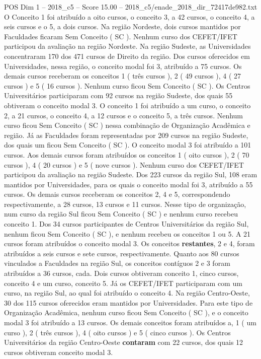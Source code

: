 \begin{textsample}{POS Dim 1 – 2018\_c5 – Score 15.00 – 2018\_c5/enade\_2018\_dir\_72417de982.txt}
O Conceito 1 foi atribuído a oito cursos, o conceito 3, a 42 cursos, o conceito 4, a seis cursos e o 5, a dois cursos.
Na região Nordeste, dois cursos mantidos por Faculdades ficaram Sem Conceito ( SC ).
Nenhum curso dos CEFET/IFET participou da avaliação na região Nordeste.
Na região Sudeste, as Universidades concentraram 170 dos 471 cursos de Direito da região.
Dos cursos oferecidos em Universidades, nessa região, o conceito modal foi 3, atribuído a 75 cursos.
Os demais cursos receberam os conceitos 1 ( três cursos ), 2 ( 49 cursos ), 4 ( 27 cursos ) e 5 ( 16 cursos ).
Nenhum curso ficou Sem Conceito ( SC ).
Os Centros Universitários participaram com 92 cursos na região Sudeste, dos quais 55 obtiveram o conceito modal 3.
O conceito 1 foi atribuído a um curso, o conceito 2, a 21 cursos, o conceito 4, a 12 cursos e o conceito 5, a três cursos.
Nenhum curso ficou Sem Conceito ( SC ) nessa combinação de Organização Acadêmica e região.
Já as Faculdades foram representadas por 209 cursos na região Sudeste, dos quais um ficou Sem Conceito ( SC ).
O conceito modal 3 foi atribuído a 101 cursos.
Aos demais cursos foram atribuídos os conceitos 1 ( oito cursos ), 2 ( 70 cursos ), 4 ( 20 cursos ) e 5 ( nove cursos ).
Nenhum curso dos CEFET/IFET participou da avaliação na região Sudeste.
Dos 223 cursos da região Sul, 108 eram mantidos por Universidades, para os quais o conceito modal foi 3, atribuído a 55 cursos.
Os demais cursos receberam os conceitos 2, 4 e 5, correspondendo respectivamente, a 28 cursos, 13 cursos e 11 cursos.
Nesse tipo de organização, num curso da região Sul ficou Sem Conceito ( SC ) e nenhum curso recebeu conceito 1.
Dos 34 cursos participantes de Centros Universitários da região Sul, nenhum ficou Sem Conceito ( SC ), e nenhum recebeu os conceitos 1 ou 5.
A 21 cursos foram atribuídos o conceito modal 3.
Os conceitos \textbf{restantes}, 2 e 4, foram atribuídos a seis cursos e sete cursos, respectivamente.
Quanto aos 80 cursos vinculados a Faculdades na região Sul, os conceitos contíguos 2 e 3 foram atribuídos a 36 cursos, cada.
Dois cursos obtiveram conceito 1, cinco cursos, conceito 4 e um curso, conceito 5.
Já os CEFET/IFET participaram com um curso, na região Sul, ao qual foi atribuído o conceito 4.
Na região Centro-Oeste, 30 dos 115 cursos oferecidos eram mantidos por Universidades.
Para este tipo de Organização Acadêmica, nenhum curso ficou Sem Conceito ( SC ), e o conceito modal 3 foi atribuído a 13 cursos.
Os demais conceitos foram atribuídos a, 1 ( um curso ), 2 ( três cursos ), 4 ( oito cursos ) e 5 ( cinco cursos ).
Os Centros Universitários da região Centro-Oeste \textbf{contaram} com 22 cursos, dos quais 12 cursos obtiveram conceito modal 3.

\end{textsample}
